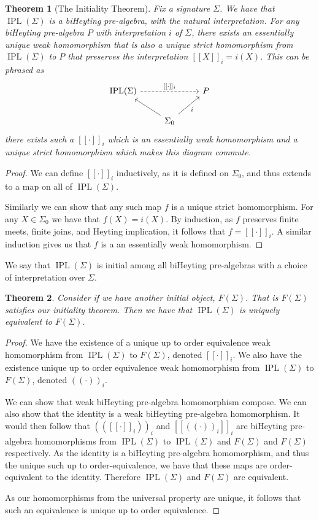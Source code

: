 \documentclass[12pt]{article}
\newtheorem{theorem}{Theorem}
\DeclareMathOperator{\IPL}{IPL}
\begin{document}
\begin{theorem}[The Initiality Theorem]
    Fix a signature $\Sigma$. We have that $\IPL(\Sigma)$ is a biHeyting pre-algebra, with the natural interpretation. For any biHeyting pre-algebra $P$ with interpretation $i$ of $\Sigma$, there exists an essentially unique weak homomorphism that is also a unique strict homomorphism from $\IPL(\Sigma)$ to $P$ that preserves the interpretation $[[X]]_i = i(X)$. This can be phrased as 
    \[
    \begin{tikzcd}
        {\text{IPL}(\Sigma)} && P \\
        & {\Sigma_0}
        \arrow["{[[\cdot]]_i}", dashed, from=1-1, to=1-3]
        \arrow[from=2-2, to=1-1]
        \arrow["i"', from=2-2, to=1-3]
    \end{tikzcd}
    \]
    there exists such a $[[\cdot]]_i$ which is an essentially weak homomorphism and a unique strict homomorphism which makes this diagram commute.  
\end{theorem}
\begin{proof}
    We can define $[[\cdot]]_i$ inductively, as it is defined on $\Sigma_0$, and thus extends to a map on all of $\IPL(\Sigma)$.

    Similarly we can show that any such map $f$ is a unique strict homomorphism. For any $X \in \Sigma_0$ we have that $f(X) = i(X)$. By induction, as $f$ preserves finite meets, finite joins, and Heyting implication, it follows that $f = [[\cdot]]_i$. A similar induction gives us that $f$ is a an essentially weak homomorphism. 
\end{proof}

\noindent We say that $\IPL(\Sigma)$ is initial among all biHeyting pre-algebras with a choice of interpretation over $\Sigma$.

\begin{theorem}
    Consider if we have another initial object, $F(\Sigma)$. That is $F(\Sigma)$ satisfies our initiality theorem. Then we have that $\IPL(\Sigma)$ is uniquely equivalent to $F(\Sigma)$.
\end{theorem}
\begin{proof}
    We have the existence of a unique up to order equivalence weak homomorphism from $\IPL(\Sigma)$ to $F(\Sigma)$, denoted $[[\cdot]]_i$. We also have the existence unique up to order equivalence weak homomorphism from $\IPL(\Sigma)$ to $F(\Sigma)$, denoted $((\cdot))_i$.

    We can show that weak biHeyting pre-algebra homomorphism compose. We can also show that the identity is a weak biHeyting pre-algebra homomorphism. It would then follow that $(([[\cdot]]_i))_i$ and $[[((\cdot))_i]]_i$ are biHeyting pre-algebra homomorphisms from $\IPL(\Sigma)$ to $\IPL(\Sigma)$ and $F(\Sigma)$ and $F(\Sigma)$ respectively. As the identity is a biHeyting pre-algebra homomorphism, and thus the unique such up to order-equivalence, we have that these maps are order-equivalent to the identity. Therefore $\IPL(\Sigma)$ and $F(\Sigma)$ are equivalent.

    As our homomorphisms from the universal property are unique, it follows that such an equivalence is unique up to order equivalence. 
\end{proof}
\end{document}
